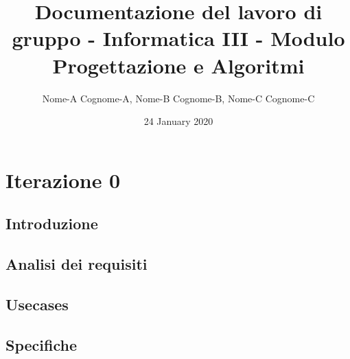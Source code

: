 \documentclass[11pt,twoside,openright,italian]{book} %
\title{Documentazione del lavoro di gruppo - Informatica III - Modulo Progettazione e Algoritmi}
\author{Nome-A Cognome-A, Nome-B Cognome-B, Nome-C Cognome-C}
\date{24 January 2020}
\newcounter{savepage}
\begin{document}
\frontmatter
 \label{Copertina}

\newpage\null\thispagestyle{empty}\newpage

{\pagestyle{plain}
\tableofcontents
\cleardoublepage}
 \label{Indice_generale}

{\pagestyle{plain}
\listoffigures
{} \label{Indice_delle_figure}
\cleardoublepage}

\listoftables
{} \label{Indice_delle_tabelle}



\mainmatter
\setcounter{page}{\thesavepage+2}

\setcounter{part}{-1}
\part{Iterazione 0} \hypertarget{part::\theHpart}{}

\setcounter{chapter}{0}

\chapter{Introduzione} \label{chap:Introduzione} \hypertarget{chapter::\theHchapter}{}


\chapter{Analisi dei requisiti} \label{chap:Analisi dei requisiti} \hypertarget{chapter::\theHchapter}{}


\chapter{Usecases} \label{chap:Usecases} \hypertarget{chapter::\theHchapter}{}


\chapter{Specifiche} \label{chap:Specifiche} \hypertarget{chapter::\theHchapter}{}

\end{document}

